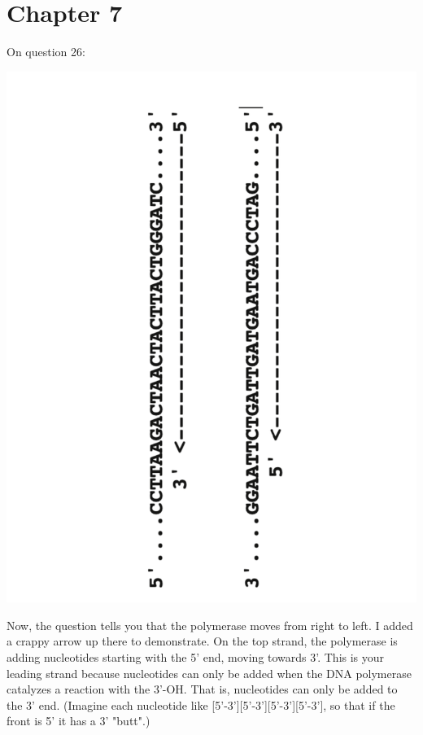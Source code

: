 \documentclass[11pt]{article}
\begin{document}
 


\section{Chapter 7}

On question 26:

\vspace{-30mm}
\includegraphics[angle=270, scale = 0.5]{chp7-26}
\vspace{-30mm}

Now, the question tells you that the polymerase moves from right to left. I added a crappy arrow up there to demonstrate. On the top strand, the polymerase is adding nucleotides starting with the 5' end, moving towards 3'. This is your leading strand because nucleotides can only be added when the DNA polymerase catalyzes a reaction with the 3'-OH. That is, nucleotides can only be added to the 3' end. (Imagine each nucleotide like [5'-3'][5'-3'][5'-3'][5'-3'], so that if the front is 5' it has a 3' "butt".)
\end{document}

